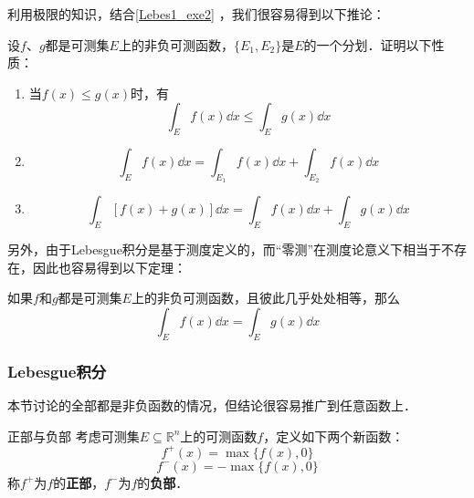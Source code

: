 利用极限的知识，结合\autoref{Lebes1_exe2} ，我们很容易得到以下推论：

\begin{corollary}{}
设$f$、$g$都是可测集$E$上的非负可测函数，$\{E_1, E_2\}$是$E$的一个分划．证明以下性质：
\begin{enumerate}
\item 当$f(x)\leq g(x)$时，有
\begin{equation}
\int_E f(x) \dd x\leq \int_E g(x) \dd x
\end{equation}
\item 
\begin{equation}
\int_E f(x) \dd x=\int_{E_1} f(x) \dd x+\int_{E_2} f(x) \dd x
\end{equation}
\item 
\begin{equation}
\int_E [f(x)+g(x)] \dd x = \int_E f(x) \dd x+\int_E g(x) \dd x
\end{equation}
\end{enumerate}
\end{corollary}

另外，由于Lebesgue积分是基于测度定义的，而“零测”在测度论意义下相当于不存在，因此也容易得到以下定理：

\begin{theorem}{}
如果$f$和$g$都是可测集$E$上的非负可测函数，且彼此几乎处处相等，那么
\begin{equation}
\int_E f(x) \dd x = \int_E g(x) \dd x
\end{equation}
\end{theorem}






\subsubsection{Lebesgue积分}

本节讨论的全部都是非负函数的情况，但结论很容易推广到任意函数上．

\begin{definition}{正部与负部}
考虑可测集$E\subseteq\mathbb{R}^n$上的可测函数$f$，定义如下两个新函数：
\begin{equation}
f^+(x) = \max\{f(x), 0\}
\end{equation}
\begin{equation}\label{Lebes1_eq8}
f^-(x) = -\max\{f(x), 0\}
\end{equation}
称$f^+$为$f$的\textbf{正部}，$f^-$为$f$的\textbf{负部}．

\end{definition}

